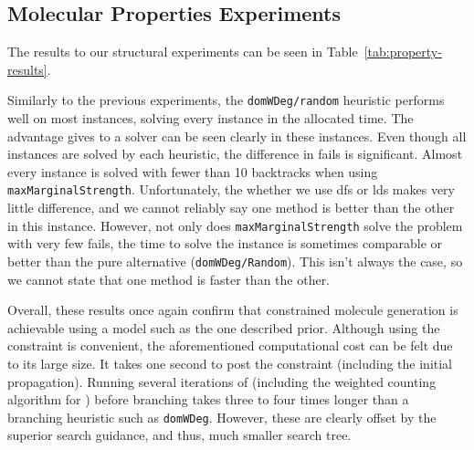\documentclass[../Document.tex]{subfiles}
\begin{document}
\subsection{Molecular Properties Experiments}
The results to our structural experiments can be seen in Table~\ref{tab:property-results}.

Similarly to the previous experiments, the \texttt{domWDeg/random} heuristic performs well on most instances, solving every instance in the allocated time.
The advantage \bp gives to a solver can be seen clearly in these instances.
Even though all instances are solved by each heuristic, the difference in fails is significant.
Almost every instance is solved with fewer than 10 backtracks when using \texttt{maxMarginalStrength}.
Unfortunately, the whether we use \gls{dfs} or \gls{lds} makes very little difference, and we cannot reliably say one method is better than the other in this instance.
However, not only does \texttt{maxMarginalStrength} solve the problem with very few fails, the time to solve the instance is sometimes comparable or better than the pure \cp alternative (\ie \texttt{domWDeg/Random}).
This isn't always the case, so we cannot state that one method is faster than the other.

Overall, these results once again confirm that constrained molecule generation is achievable using a \cp model such as the one described prior.
Although using the \grammar constraint is convenient, the aforementioned computational cost can be felt due to its large size.
It takes one second to post the constraint (including the initial propagation).
Running several iterations of \bp (including the weighted counting algorithm for \grammar) before branching takes three to four times longer than a branching heuristic such as \texttt{domWDeg}.
However, these are clearly offset by the superior search guidance, and thus, much smaller search tree.
\end{document}
